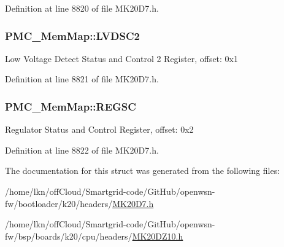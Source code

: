 Definition at line 8820 of file M\+K20\+D7.\+h.

\subsubsection[{\texorpdfstring{L\+V\+D\+S\+C2}{LVDSC2}}]{ P\+M\+C\+\_\+\+Mem\+Map\+::\+L\+V\+D\+S\+C2}\hypertarget{struct_p_m_c___mem_map_a934db8b39dae8b99a9a9165df50145f5}{}\label{struct_p_m_c___mem_map_a934db8b39dae8b99a9a9165df50145f5}
Low Voltage Detect Status and Control 2 Register, offset\+: 0x1 

Definition at line 8821 of file M\+K20\+D7.\+h.

\subsubsection[{\texorpdfstring{R\+E\+G\+SC}{REGSC}}]{ P\+M\+C\+\_\+\+Mem\+Map\+::\+R\+E\+G\+SC}\hypertarget{struct_p_m_c___mem_map_aa14a55a46cc237589d6c01ebf7676c2a}{}\label{struct_p_m_c___mem_map_aa14a55a46cc237589d6c01ebf7676c2a}
Regulator Status and Control Register, offset\+: 0x2 

Definition at line 8822 of file M\+K20\+D7.\+h.



The documentation for this struct was generated from the following files\+:\begin{DoxyCompactItemize}
\item 
/home/lkn/off\+Cloud/\+Smartgrid-\/code/\+Git\+Hub/openwsn-\/fw/bootloader/k20/headers/\hyperlink{bootloader_2k20_2headers_2_m_k20_d7_8h}{M\+K20\+D7.\+h}\item 
/home/lkn/off\+Cloud/\+Smartgrid-\/code/\+Git\+Hub/openwsn-\/fw/bsp/boards/k20/cpu/headers/\hyperlink{_m_k20_d_z10_8h}{M\+K20\+D\+Z10.\+h}\end{DoxyCompactItemize}
